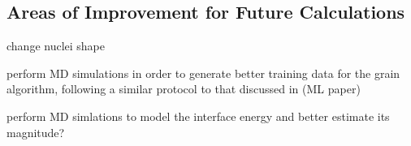 \subsection{Areas of Improvement for Future Calculations}

change nuclei shape

perform MD simulations in order to generate better training data for the grain algorithm, following a similar protocol to that discussed in (ML paper)

perform MD simlations to model the interface energy and better estimate its magnitude?
